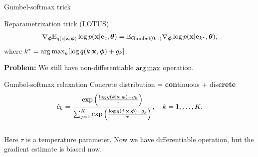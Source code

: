 \begin{frame}{Gumbel-softmax trick}
	\begin{block}{Reparametrization trick (LOTUS)}
		\vspace{-0.7cm}
		\[
			\nabla_{\boldsymbol{\phi}} \mathbb{E}_{q(c | \mathbf{x}, \boldsymbol{\phi})} \log p(\mathbf{x} | \mathbf{e}_{c} , \boldsymbol{\theta}) = \mathbb{E}_{\text{Gumbel}(0, 1)} \nabla_{\boldsymbol{\phi}} \log p(\mathbf{x} | \mathbf{e}_{k^*} , \boldsymbol{\theta}),
		\]
		where $k^* = \operatorname*{arg\,max}_k [\log q(k | \mathbf{x}, \boldsymbol{\phi}) + g_k]$.
	\end{block}
	\textbf{Problem:} We still have non-differentiable $\operatorname*{arg\,max}$ operation.
	
	\begin{block}{Gumbel-softmax relaxation}
		{\color{violet}Con}{\color{teal}crete} distribution = {\color{violet}\textbf{con}tinuous} + {\color{teal}dis\textbf{crete}}
		\vspace{-0.2cm}
		\[
			\hat{c}_k = \frac{\exp \left(\frac{\log q(k | \mathbf{x}, \boldsymbol{\phi}) + g_k}{\tau}\right)}{\sum_{j=1}^K \exp \left(\frac{\log q(j | \mathbf{x}, \boldsymbol{\phi}) + g_j}{\tau}\right)}, \quad k = 1, \dots, K.
		\]
		\vspace{-0.4cm} \\
		Here $\tau$ is a temperature parameter. Now we have differentiable operation, but the gradient estimate is biased now.
 	\end{block}
\end{frame}
